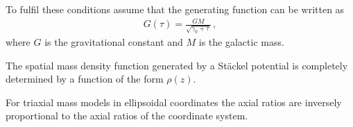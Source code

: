     To fulfil these conditions assume that the generating function can be written as
    \begin{gather}
        G(\tau) = \frac{GM}{\sqrt{\gamma_0 + \tau}}\,,
    \end{gather}
    where $G$ is the gravitational constant and $M$ is the galactic mass.

    \begin{theorem}[Kuzmin]
        The spatial mass density function generated by a St\"ackel potential is completely determined by a function of the form $\rho(z)$.
    \end{theorem}
    \begin{result}
        For triaxial mass models in ellipsoidal coordinates the axial ratios are inversely proportional to the axial ratios of the coordinate system.
    \end{result}